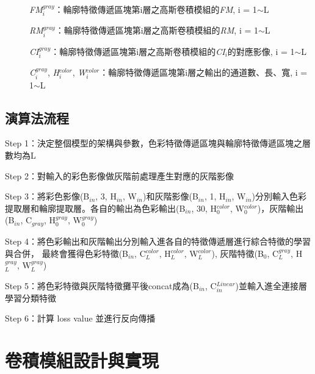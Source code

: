 \documentclass[class=NCU_thesis, crop=false]{standalone}
\begin{document}
\begin{description}
		\item[]\textit{FM}$^{gray}_{i}$：輪廓特徵傳遞區塊第i層之高斯卷積模組的\textit{FM}, i = 1$\sim$L
		\item[]\textit{RM}$^{gray}_{i}$：輪廓特徵傳遞區塊第i層之高斯卷積模組的\textit{RM}, i = 1$\sim$L
		\item[]\textit{CI}$^{gray}_{i}$：輪廓特徵傳遞區塊第i層之高斯卷積模組的\textit{CI}$_{i}$的對應影像, i = 1$\sim$L
		\item[]\textit{C}$^{gray}_{i}$, \textit{H}$^{color}_{i}$, \textit{W}$^{color}_{i}$：輪廓特徵傳遞區塊第i層之輸出的通道數、長、寬, i = 1$\sim$L
	\end{description}

\subsection{演算法流程}
Step 1：決定整個模型的架構與參數，色彩特徵傳遞區塊與輪廓特徵傳遞區塊之層數均為L

Step 2：對輸入的彩色影像做灰階前處理產生對應的灰階影像

Step 3：將彩色影像(B$_{in}$, 3, H$_{in}$, W$_{in}$)和灰階影像(B$_{in}$, 1, H$_{in}$, W$_{in}$)分別輸入色彩提取層和輪廓提取層。各自的輸出為色彩輸出(B$_{in}$, 30, H$^{color}_{0}$, W$^{color}_{0}$)，灰階輸出(B$_{in}$, C${_{gray}}$, H$^{gray}_{0}$, W$^{gray}_{0}$)

Step 4：將色彩輸出和灰階輸出分別輸入進各自的特徵傳遞層進行綜合特徵的學習與合併，
		最終會獲得色彩特徵(B$_{in}$, C$^{color}_{L}$, H$^{color}_{L}$, W$^{color}_{L}$), 灰階特徵(B$_{0}$, C$^{gray}_{L}$, H$^{gray}_{L}$, W$^{gray}_{L}$)

Step 5：將色彩特徵與灰階特徵攤平後concat成為(B$_{in}$, C$^{Linear}_{in}$)並輸入進全連接層學習分類特徵

Step 6：計算 loss value 並進行反向傳播


\pagebreak

\section{卷積模組設計與實現}
\end{document}
